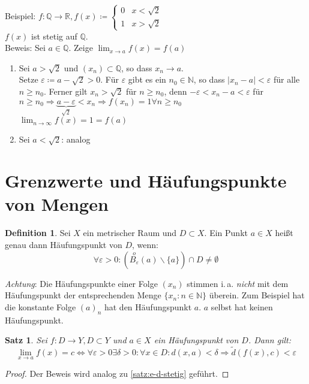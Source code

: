 \documentclass[ngerman,titlepage,twoside, parskip=half*]{scrreprt}
\newcommand*{\N}{\mathbb{N}}
\newcommand*{\Q}{\mathbb{Q}}
\newcommand*{\R}{\mathbb{R}}
\theoremstyle{plain}
\newtheorem{theorem}{Satz}[section]
\theoremstyle{definition}
\newtheorem{definition}{Definition}
\theoremstyle{remark}
\begin{document}
Beispiel: $f\colon\Q\rightarrow\R , f(x)\coloneqq\begin{cases}0 & x<\sqrt{2}\\1 & x>\sqrt{2}\end{cases}$\\
$f(x)$ ist stetig auf $\Q$.\\
Beweis: Sei $a\in \Q$. Zeige $\lim_{x\rightarrow a} f(x)=f(a)$
\begin{enumerate}[1. F{a}ll]
\item Sei $a>\sqrt{2}$ und $(x_n)\subset \Q$, so dass $x_n\rightarrow a$.\\
  Setze $\varepsilon \coloneqq a-\sqrt{2}>0$. Für $\varepsilon$ gibt es ein
  $n_0\in \N$, so dass $|x_n-a| <\varepsilon$ für alle $n\geq
  n_0$. Ferner gilt $x_n>\sqrt{2}$ für $n\geq n_0$, denn $-\varepsilon
  <x_n-a<\varepsilon$ für $n\geq n_0 \Rightarrow
  \underbrace{a-\varepsilon}_{\sqrt{2}} <x_n
  \Rightarrow f(x_n)=1 \forall n\geq n_0$\\
  $\lim_{n\rightarrow \infty} f(x)=1=f(a)$
\item Sei $a<\sqrt{2}$: analog
\end{enumerate}

\section{Grenzwerte und Häufungspunkte von Mengen}
\begin{definition}
  Sei $X$ ein metrischer Raum und $D\subset X$. Ein Punkt $a\in X$
  heißt genau dann Häufungspunkt von $D$, wenn:
  \[\forall \varepsilon >0\colon
  \left(\stackrel{o}{B_{\varepsilon}}(a)\backslash \{a\} \right)\cap D
  \neq \emptyset\]
\end{definition}
\emph{Achtung}: Die Häufungspunkte einer Folge $(x_n)$ stimmen
i.\,a. \emph{nicht} mit dem Häufungspunkt der entsprechenden Menge
$\{x_n\colon n\in\N\}$ überein. Zum Beispiel hat die konstante Folge $(a)_n$
hat den Häufungspunkt $a$. $a$ selbst hat keinen Häufungspunkt.

\begin{theorem}
  Sei $f\colon D\rightarrow Y, D\subset Y$ und $a\in X$ ein Häufungspunkt
  von $D$. Dann gilt:
  \[\lim_{x\rightarrow a} f(x)=c\Leftrightarrow \forall\varepsilon >0
  \exists \delta >0\colon\forall x\in D\colon d(x,a) <\delta \Rightarrow
  \tilde{d}(f(x),c)<\varepsilon\]
\end{theorem}
\begin{proof}
  Der Beweis wird analog zu \autoref{satz:e-d-stetig} geführt.
\end{proof}
\end{document}
